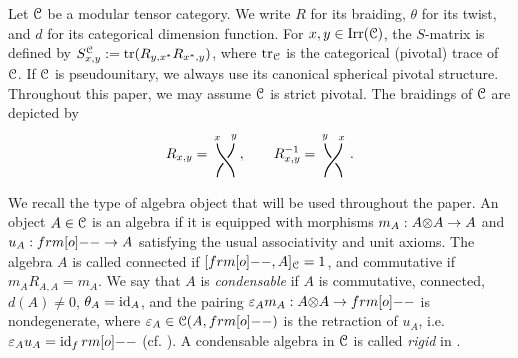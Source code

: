 \documentclass{amsart}
\begin{document}
Let ${\EuScript{C}}$ be a modular tensor category. We write $R$ for its braiding,
$\theta$ for its twist, and $d$ for its categorical dimension function.
For $x,y\in \operatorname{Irr}({\EuScript{C}})$, the $S$-matrix is defined by
$S^{\EuScript{C}}_{x,y}:=\operatorname{tr}(R_{y,x^*}R_{x^*,y})$, where $\operatorname{tr}_{\EuScript{C}}$ is the categorical (pivotal) trace of ${\EuScript{C}}$. If ${\EuScript{C}}$ is pseudounitary, we
always use its canonical spherical pivotal structure. Throughout this paper, we may assume ${\EuScript{C}}$ is strict pivotal. The braidings of ${\EuScript{C}}$ are depicted by
\[
R_{x,y}=\vcenter{\hbox{%
\begin{tikzpicture}[x=1pc, y=1pc, thick]
  \begin{scope}[even odd rule]
    \clip[overlay] (-2,-2) rectangle (2,2) (0,0) circle (2.5pt);
    \draw (0.5,1)
      .. controls (0.5,0.2) and (-0.5,-0.2) .. (-0.5,-1);
  \end{scope}
  \draw (-0.5,1)
    .. controls (-0.5,0.2) and (0.5,-0.2) .. (0.5,-1);
  \node[anchor=south, inner sep=2pt] at (-0.5,1) {$\scriptstyle x$};
  \node[anchor=south, inner sep=2pt] at (0.5,1) {$\scriptstyle y$};
\end{tikzpicture}%
}}, \qquad
R_{x,y}^{-1}=\vcenter{\hbox{%
\begin{tikzpicture}[x=1pc, y=1pc, thick]
  \begin{scope}[even odd rule]
    \clip[overlay] (-2,-2) rectangle (2,2) (0,0) circle (2.5pt);
    \draw (-0.5,1)
      .. controls (-0.5,0.2) and (0.5,-0.2) .. (0.5,-1);
  \end{scope}
  \draw (0.5,1)
    .. controls (0.5,0.2) and (-0.5,-0.2) .. (-0.5,-1);
  \node[anchor=south, inner sep=2pt] at (-0.5,1) {$\scriptstyle y$};
  \node[anchor=south, inner sep=2pt] at (0.5,1) {$\scriptstyle x$};
\end{tikzpicture}%
}}\,.
\]
 

We recall the type of algebra object that will be used throughout the
paper. An object $A\in {\EuScript{C}}$ is an algebra if it is equipped with morphisms
$m_A:A{\otimes} A\to A$ and $u_A:\1\to A$ satisfying the usual associativity and
unit axioms. The algebra $A$ is called connected if $[\1,A]_\CC=1$, and
commutative if $m_AR_{A,A}=m_A$. We say that $A$ is
\emph{condensable} if $A$ is commutative, connected, $d(A)\ne 0$,
$\theta_A=\operatorname{id}_A$, and the pairing $\e_A m_A:A\o A\to \1$ is nondegenerate,
where $\e_A\in \CC(A,\1)$  is the retraction of $u_A$, i.e. $\e_A u_A = \id_\1$ (cf. \cite[p. 193]{KO02}). A condensable algebra in ${\EuScript{C}}$ is called \emph{rigid} in \cite{KO02}.
\end{document}
